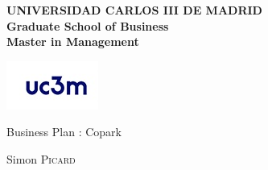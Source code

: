 \documentclass[12pt,a4paper,oneside]{book}
\begin{document}


\begin{titlepage}
\noindent \begin{minipage}{0.83\textwidth}
\noindent \textbf{UNIVERSIDAD CARLOS III DE MADRID}\hfill{}\\
\textbf{Graduate School of Business}\hfill{}\\
\textbf{Master in Management}\hfill{}
\end{minipage}
\begin{minipage}{0.17\textwidth}
\includegraphics[keepaspectratio=true,width=\textwidth]{../images/logo_UC3M_universidad_Carlos_III_Madrid.jpg}
\end{minipage}
\begin{center}
\vfill{}\vfill{}\vfill{}
{\Huge Business Plan : Copark}
{\Huge \par}
\begin{center}{\LARGE Simon \textsc{Picard}}\end{center}{\Huge \par}
\vfill{}

\end{center}
\end{titlepage}
\end{document}

